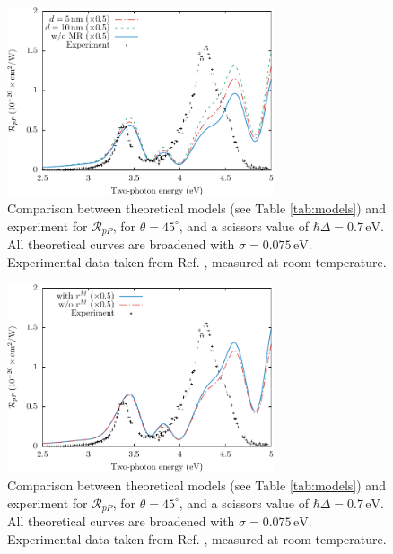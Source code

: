 \begin{figure}
\centering
\includegraphics[width=0.7\textwidth]{figures/fig-4_4_12}
\caption{Comparison between theoretical models (see Table
\ref{tab:models}) and experiment for $\mathcal{R}_{pP}$, for
$\theta=45^{\circ}$, and a scissors value of $\hbar\Delta = 0.7\,\text{eV}$.
All theoretical curves are broadened with $\sigma=0.075\,\text{eV}$.
Experimental data taken from Ref. \cite{mitchellSS01}, measured at room
temperature.}
\label{fig:mr1}
\end{figure}

\begin{figure}
\centering
\includegraphics[width=0.7\textwidth]{figures/fig-4_4_13}
\caption{Comparison between theoretical models (see Table
\ref{tab:models}) and experiment for $\mathcal{R}_{pP}$, for
$\theta=45^{\circ}$, and a scissors value of $\hbar\Delta = 0.7\,\text{eV}$.
All theoretical curves are broadened with $\sigma=0.075\,\text{eV}$.
Experimental data taken from Ref. \cite{mitchellSS01}, measured at room
temperature.}
\label{fig:mr2}
\end{figure}

